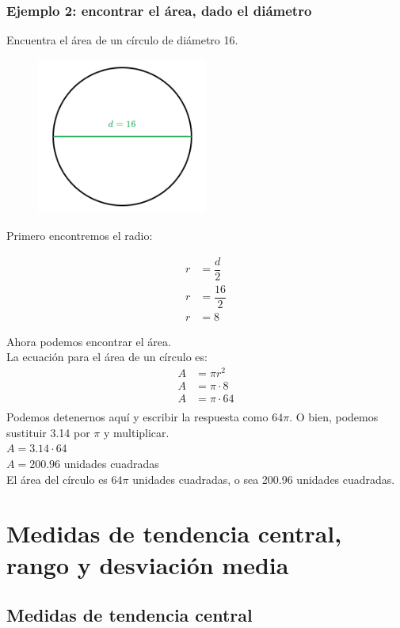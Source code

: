 \documentclass[11pt]{book}
\begin{document}
\subsubsection{Ejemplo 2: encontrar el área, dado el diámetro}
Encuentra el área de un círculo de diámetro 16.
\begin{figure}[H]
  \centering
  \includegraphics[width=0.5\textwidth]{./Unidad 2/Images/figS10_002.png}
\end{figure}
Primero encontremos el radio:

\begin{align*}
  r & = \dfrac d2     \\
  r & = \dfrac{16}{2} \\
  r & = 8
\end{align*}

Ahora podemos encontrar el área.\\

La ecuación para el área de un círculo es:
\begin{align*}
  A & = \pi r^2      \\
  A & = \pi \cdot 8  \\
  A & = \pi \cdot 64 \\
\end{align*}
Podemos detenernos aquí y escribir la respuesta como $64\pi$. O bien, podemos sustituir 3.14 por $\pi$ y multiplicar.\\
$A = 3.14 \cdot 64$\\
$A = 200.96$ unidades cuadradas\\

El área del círculo es $64\pi$ unidades cuadradas, o sea 200.96 unidades cuadradas.

\section{Medidas de tendencia central, rango y desviación media}
\subsection{Medidas de tendencia central}
\end{document}
